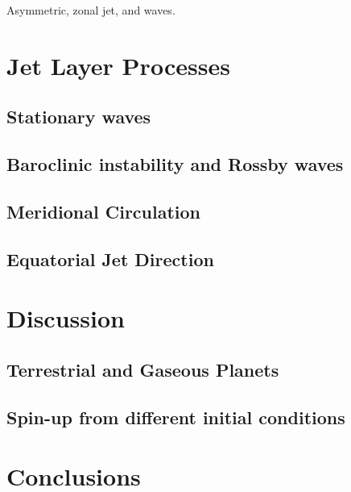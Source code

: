 Asymmetric, zonal jet, and waves.



\section{Jet Layer Processes}

\subsection*{Stationary waves}

\subsection*{Baroclinic instability and Rossby waves}

\subsection*{Meridional Circulation}

\subsection*{Equatorial Jet Direction}



\section{Discussion}

\subsection*{Terrestrial and Gaseous Planets}

\subsection*{Spin-up from different initial conditions}



\section{Conclusions}




% 
% 
